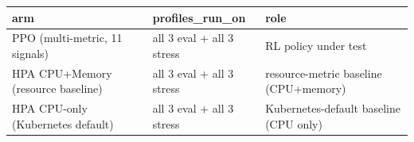 \begin{tabular}{lll}
\hline
arm & profiles\_run\_on & role \\
\hline
PPO (multi-metric, 11 signals) & all 3 eval + all 3 stress & RL policy under test \\
HPA CPU+Memory (resource baseline) & all 3 eval + all 3 stress & resource-metric baseline (CPU+memory) \\
HPA CPU-only (Kubernetes default) & all 3 eval + all 3 stress & Kubernetes-default baseline (CPU only) \\
\hline
\end{tabular}
